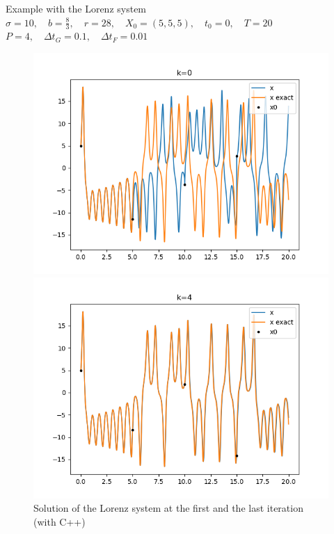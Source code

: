 \begin{frame}{Example with the Lorenz system}
	\centering
	$\sigma=10, \quad b=\frac{8}{3}, \quad r=28, \quad X_0=(5,5,5), \quad t_0=0, \quad T=20$
	$P=4,\quad \Delta t_G=0.1, \quad \Delta t_F=0.01$
	\begin{figure}
		\centering
		\begin{minipage}{0.48\linewidth}
			\includegraphics[width=\linewidth]{"images/parareal/lorenz_sol_0.png"}
		\end{minipage}
		\begin{minipage}{0.48\linewidth}
			\includegraphics[width=\linewidth]{"images/parareal/lorenz_sol_4.png"}
		\end{minipage}
		\caption{Solution of the Lorenz system at the first and the last iteration (with C++)}
	\end{figure}
\end{frame}

